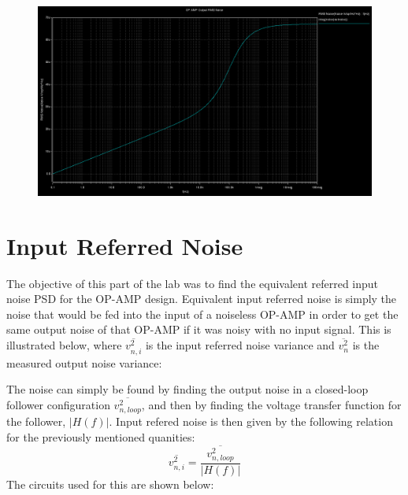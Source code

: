 \documentclass[12pt]{article}
\begin{document}
\FloatBarrier
\begin{figure}[h!]
\begin{center}
 \includegraphics[scale=0.3]{./out_noise_flick.png}
\end{center}
\end{figure}
\FloatBarrier
\section{Input Referred Noise}
The objective of this part of the lab was to find the equivalent referred input noise PSD for the OP-AMP design. Equivalent input referred noise is simply the noise that would be fed into the input of a noiseless OP-AMP in order to get the same output noise of that OP-AMP if it was noisy with no input signal. This is illustrated below, where $\overline{v_{n,i}^2}$ is the input referred noise variance and $\overline{v_{n}^2}$ is the measured output noise variance:
\FloatBarrier
\begin{figure}[h!]
  \begin{center}
    	\hspace*{0.5in}\resizebox{0.9\textwidth}{!}{}
  \end	{center}
\end {figure}
\FloatBarrier
The noise can simply be found by finding the output noise in a closed-loop follower configuration $\overline{v_{n,loop}^2}$, and then by finding the voltage transfer function for the follower, $|H(f)|$. Input refered noise is then given by the following relation for the previously mentioned quanities:
\begin{equation}
\overline{v_{n,i}^2} = \frac{\overline{v_{n,loop}^2}}{|H(f)|}
\end{equation}
The circuits used for this are shown below:
\end{document}
